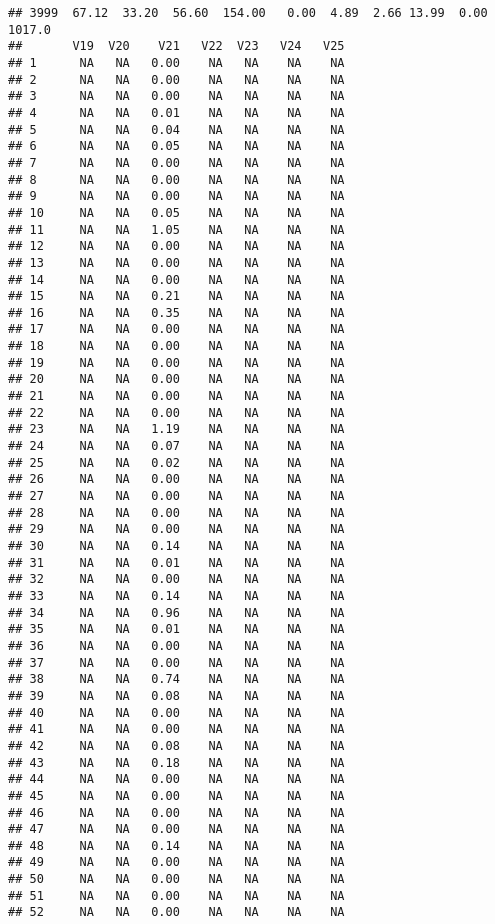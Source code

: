 \documentclass{article}\usepackage{graphicx, color}
\makeatletter
\newenvironment{kframe}{%
 \def\at@end@of@kframe{}%
 \ifinner\ifhmode%
  \def\at@end@of@kframe{\end{minipage}}%
  \begin{minipage}{\columnwidth}%
 \fi\fi%
 \def\FrameCommand##1{\hskip\@totalleftmargin \hskip-\fboxsep
 \colorbox{shadecolor}{##1}\hskip-\fboxsep
     \hskip-\linewidth \hskip-\@totalleftmargin \hskip\columnwidth}%
 \MakeFramed {\advance\hsize-\width
   \@totalleftmargin\z@ \linewidth\hsize
   \@setminipage}}%
 {\par\unskip\endMakeFramed%
 \at@end@of@kframe}
\newenvironment{knitrout}{}{} %
\makeatother
\begin{document}
\begin{knitrout}
\begin{kframe}
\begin{verbatim}
## 3999  67.12  33.20  56.60  154.00   0.00  4.89  2.66 13.99  0.00 1017.0
##       V19  V20    V21   V22  V23   V24   V25
## 1      NA   NA   0.00    NA   NA    NA    NA
## 2      NA   NA   0.00    NA   NA    NA    NA
## 3      NA   NA   0.00    NA   NA    NA    NA
## 4      NA   NA   0.01    NA   NA    NA    NA
## 5      NA   NA   0.04    NA   NA    NA    NA
## 6      NA   NA   0.05    NA   NA    NA    NA
## 7      NA   NA   0.00    NA   NA    NA    NA
## 8      NA   NA   0.00    NA   NA    NA    NA
## 9      NA   NA   0.00    NA   NA    NA    NA
## 10     NA   NA   0.05    NA   NA    NA    NA
## 11     NA   NA   1.05    NA   NA    NA    NA
## 12     NA   NA   0.00    NA   NA    NA    NA
## 13     NA   NA   0.00    NA   NA    NA    NA
## 14     NA   NA   0.00    NA   NA    NA    NA
## 15     NA   NA   0.21    NA   NA    NA    NA
## 16     NA   NA   0.35    NA   NA    NA    NA
## 17     NA   NA   0.00    NA   NA    NA    NA
## 18     NA   NA   0.00    NA   NA    NA    NA
## 19     NA   NA   0.00    NA   NA    NA    NA
## 20     NA   NA   0.00    NA   NA    NA    NA
## 21     NA   NA   0.00    NA   NA    NA    NA
## 22     NA   NA   0.00    NA   NA    NA    NA
## 23     NA   NA   1.19    NA   NA    NA    NA
## 24     NA   NA   0.07    NA   NA    NA    NA
## 25     NA   NA   0.02    NA   NA    NA    NA
## 26     NA   NA   0.00    NA   NA    NA    NA
## 27     NA   NA   0.00    NA   NA    NA    NA
## 28     NA   NA   0.00    NA   NA    NA    NA
## 29     NA   NA   0.00    NA   NA    NA    NA
## 30     NA   NA   0.14    NA   NA    NA    NA
## 31     NA   NA   0.01    NA   NA    NA    NA
## 32     NA   NA   0.00    NA   NA    NA    NA
## 33     NA   NA   0.14    NA   NA    NA    NA
## 34     NA   NA   0.96    NA   NA    NA    NA
## 35     NA   NA   0.01    NA   NA    NA    NA
## 36     NA   NA   0.00    NA   NA    NA    NA
## 37     NA   NA   0.00    NA   NA    NA    NA
## 38     NA   NA   0.74    NA   NA    NA    NA
## 39     NA   NA   0.08    NA   NA    NA    NA
## 40     NA   NA   0.00    NA   NA    NA    NA
## 41     NA   NA   0.00    NA   NA    NA    NA
## 42     NA   NA   0.08    NA   NA    NA    NA
## 43     NA   NA   0.18    NA   NA    NA    NA
## 44     NA   NA   0.00    NA   NA    NA    NA
## 45     NA   NA   0.00    NA   NA    NA    NA
## 46     NA   NA   0.00    NA   NA    NA    NA
## 47     NA   NA   0.00    NA   NA    NA    NA
## 48     NA   NA   0.14    NA   NA    NA    NA
## 49     NA   NA   0.00    NA   NA    NA    NA
## 50     NA   NA   0.00    NA   NA    NA    NA
## 51     NA   NA   0.00    NA   NA    NA    NA
## 52     NA   NA   0.00    NA   NA    NA    NA

\end{verbatim}
\end{kframe}
\end{knitrout}
\end{document}
